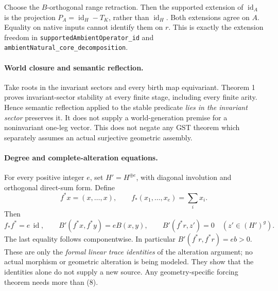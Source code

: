 \documentclass[11pt]{article}
\newcommand{\id}{\operatorname{id}}
\begin{document}
Choose the \(B\)-orthogonal range retraction. Then the supported
extension of \(\id_A\) is the projection
\(P_A=\id_H-T_K\), rather than \(\id_H\). Both extensions agree on
\(A\). Equality on native inputs cannot identify them on \(r\).
This is exactly the extension freedom in
\texttt{supportedAmbientOperator\_id} and
\texttt{ambientNatural\_core\_decomposition}.

\paragraph{World closure and semantic reflection.}
Take roots in the invariant sectors and every birth map equivariant.
Theorem 1 proves invariant-sector stability at every finite stage,
including every finite arity. Hence semantic reflection applied to
the stable predicate \emph{lies in the invariant sector} preserves it.
It does not supply a world-generation premise for a noninvariant
one-leg vector. This does not negate any GST theorem which separately
assumes an actual surjective geometric assembly.

\paragraph{Degree and complete-alteration equations.}
For every positive integer \(e\), set \(H'=H^{\oplus e}\), with
diagonal involution and orthogonal direct-sum form. Define
\[
 f^*x=(x,\ldots,x),\qquad f_*(x_1,\ldots,x_e)=\sum_i x_i.
\]
Then
\[
 f_*f^*=e\,\id,\qquad B'(f^*x,f^*y)=eB(x,y),\qquad
 B'(f^*r,z')=0\quad(z'\in(H')^g).                            \tag{8}
\]
The last equality follows componentwise. In particular
\(B'(f^*r,f^*r)=eb>0\).
These are only the \emph{formal linear trace identities} of the
alteration argument; no actual morphism or geometric alteration is
being modeled. They show that the identities alone do not supply
a new source. Any geometry-specific forcing theorem needs more
than (8).
\end{document}
